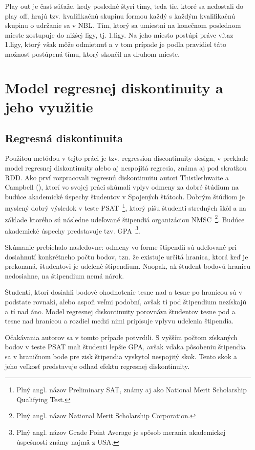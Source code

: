 \documentclass[
  digital, %
  oneside, %
  notable,   %
  lof,     %
  lot,     %
]{fithesis3}
\begin{document}
		Play out je časť súťaže, kedy posledné štyri tímy, teda tie, ktoré sa nedostali do play off, hrajú tzv. kvalifikačnú skupinu formou každý s každým kvalifikačnú skupinu o udržanie sa v NBL. Tím, ktorý sa umiestni na konečnom poslednom mieste zostupuje do nižšej ligy, tj. 1.ligy. Na jeho miesto postúpi práve víťaz 1.ligy, ktorý však môže odmietnuť a v tom prípade je podľa pravidiel táto možnosť postúpená tímu, ktorý skončil na druhom mieste. \parencite{bulletin2018}

	\chapter{Model regresnej diskontinuity a jeho využitie}
		\section{Regresná diskontinuita}
		Použitou metódou v tejto práci je tzv. regression discontinuity design, v preklade model regresnej diskontinuity alebo aj nespojitá regresia, známa aj pod skratkou RDD. Ako prví rozpracovali regresnú diskontinuitu autori Thistlethwaite a Campbell (\citeyear{thist1960}), ktorí vo svojej práci skúmali vplyv odmeny za dobré štúdium na budúce akademické úspechy študentov v Spojených štátoch. Dobrým štúdiom je myslený dobrý výsledok v teste PSAT~\footnote{Plný angl. názov Preliminary SAT, známy aj ako National Merit Scholarship Qualifying Test.}, ktorý píšu študenti stredných škôl a na základe ktorého sú následne udeľované štipendiá organizáciou NMSC~\footnote{Plný angl. názov National Merit Scholarship Corporation.}. Budúce akademické úspechy predstavuje tzv. GPA~\footnote{Plný angl. názov Grade Point Average je spôsob merania akademickej úspešnosti známy najmä z USA.}.
	
		Skúmanie prebiehalo nasledovne: odmeny vo forme štipendií sú udeľované pri dosiahnutí konkrétneho počtu bodov, tzn. že existuje určitá hranica, ktorá keď je prekonaná, študentovi je udelené štipendium. Naopak, ak študent bodovú hranicu nedosiahne, na štipendium nemá nárok. 
	
		Študenti, ktorí dosiahli bodové ohodnotenie tesne nad a tesne po hranicou sú v podstate rovnakí, alebo aspoň veľmi podobní, avšak tí pod štipendium nezískajú a tí nad áno. Model regresnej diskontinuity porovnáva študentov tesne pod a tesne nad hranicou a rozdiel medzi nimi pripisuje vplyvu udelenia štipendia. 
	
		Očakávania autorov sa v tomto prípade potvrdili. S vyšším počtom získaných bodov  v teste PSAT mali študenti lepšie GPA, avšak vďaka pôsobeniu štipendia sa v hraničnom bode pre zisk štipendia vyskytol nespojitý skok. Tento skok a jeho veľkosť predstavuje odhad efektu regresnej diskontinuity.
		
\end{document}
